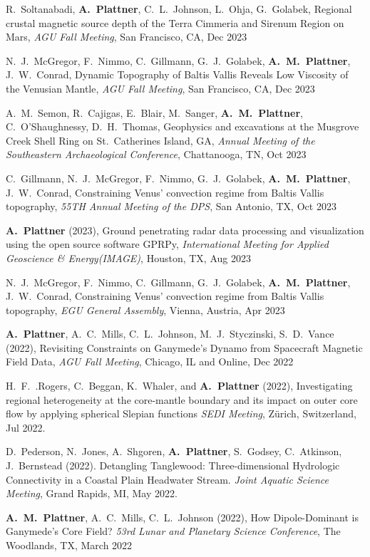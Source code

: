 \documentclass[10pt]{article}
\begin{document}
\spcp
R.~Soltanabadi, \textbf{A.~Plattner}, C.~L.~Johnson, L.~Ohja, G.~Golabek, Regional crustal magnetic source depth of the Terra Cimmeria and Sirenum Region on Mars, \emph{AGU Fall Meeting}, San Francisco, CA, Dec 2023 

\spcp
N.~J.~McGregor, F.~Nimmo, C.~Gillmann, G.~J.~Golabek, \textbf{A.~M.~Plattner}, J.~W.~Conrad, Dynamic Topography of Baltis Vallis Reveals Low Viscosity of the Venusian Mantle, \emph{AGU Fall Meeting}, San Francisco, CA, Dec 2023

\spcp
A.~M.~Semon, R.~Cajigas, E.~Blair, M.~Sanger, \textbf{A.~M.~Plattner}, C.~O'Shaughnessy, D.~H.~Thomas, Geophysics and excavations at the Musgrove Creek Shell Ring on St.\ Catherines Island, GA, \emph{Annual Meeting of the Southeastern Archaeological Conference}, Chattanooga, TN, Oct 2023

\spcp
C.~Gillmann, N.~J.~McGregor, F.~Nimmo, G.~J.~Golabek, \textbf{A.~M.~Plattner}, J.~W.~Conrad, Constraining Venus' convection regime from Baltis Vallis topography, \emph{55TH Annual Meeting of the DPS}, San Antonio, TX, Oct 2023


\spcp \textbf{A.~Plattner} (2023), Ground penetrating radar data processing and visualization using the open source software GPRPy, \emph{International Meeting for Applied Geoscience \& Energy(IMAGE)}, Houston, TX, Aug 2023

\spcp
N.~J.~McGregor, F.~Nimmo, C.~Gillmann, G.~J.~Golabek, \textbf{A.~M.~Plattner}, J.~W.~Conrad, Constraining Venus' convection regime from Baltis Vallis topography, \emph{EGU General Assembly}, Vienna, Austria, Apr 2023

\spcp \textbf{A.~Plattner}, A.~C.~Mills, C.~L.~Johnson,
M.~J.~Styczinski, S.~D.~Vance (2022), Revisiting Constraints on
Ganymede's Dynamo from Spacecraft Magnetic Field Data, \emph{AGU Fall
Meeting}, Chicago, IL and Online, Dec 2022

\spcp H.~F.~.Rogers, C.~Beggan, K.~Whaler, and \textbf{A.~Plattner}
(2022), Investigating regional heterogeneity at the core-mantle
boundary and its impact on outer core flow by applying spherical
Slepian functions \emph{SEDI Meeting}, Z\"urich, Switzerland, Jul 2022.

\spcp D.~Pederson, N.~Jones, A.~Shgoren, \textbf{A.~Plattner},
S.~Godsey, C.~Atkinson, J.~Bernstead (2022). Detangling Tanglewood:
Three-dimensional Hydrologic Connectivity in a Coastal Plain Headwater
Stream. \emph{Joint Aquatic Science Meeting}, Grand Rapids, MI, May
2022.

\spcp \textbf{A.~M.~Plattner}, A.~C.~Mills, C.~L.~Johnson (2022), How
Dipole-Dominant is Ganymede’s Core Field?  \emph{53rd Lunar and
Planetary Science Conference}, The Woodlands, TX, March 2022
\end{document}
